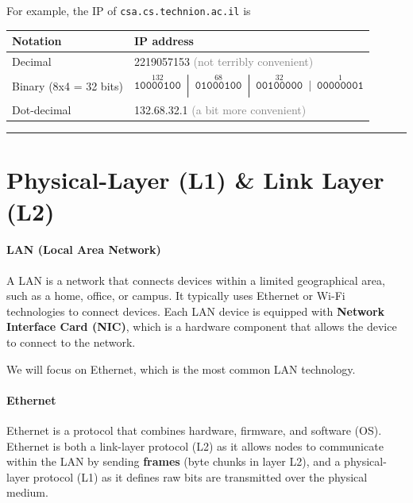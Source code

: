 \documentclass[openany,12pt]{book}
\begin{document}
\vspace{0.5em} %
\begin{center}
  For example, the IP of \texttt{csa.cs.technion.ac.il} is
  \begin{tabular}{ll}
    \toprule
    \textbf{Notation}      & \textbf{IP address}                                                              \\
    \midrule
    Decimal                & 2219057153 \textcolor{gray}{(not terribly convenient)}                           \\[1.5ex]
    Binary (8x4 = 32 bits) &
    $\overset{132}{\texttt{10000100}} \enspace | \enspace
      \overset{68}{\texttt{01000100}} \enspace | \enspace
      \overset{32}{\texttt{00100000}} \enspace | \enspace
    \overset{1}{\texttt{00000001}}$                                                                           \\[1.5ex]
    Dot-decimal            & \textcolor{blue!80!black}{132.68.32.1} \textcolor{gray}{(a bit more convenient)} \\
    \bottomrule
  \end{tabular}
\end{center}



\noindent\rule{\linewidth}{0.5pt}


\section*{Physical-Layer (L1) \& Link Layer (L2)}

\paragraph{LAN (Local Area Network)} A LAN is a network that connects devices within a limited geographical area, such as a home, office, or campus. It typically uses Ethernet or Wi-Fi technologies to connect devices. Each LAN device is equipped with \textbf{Network Interface Card (NIC)}, which is a hardware component that allows the device to connect to the network. 

We will focus on Ethernet, which is the most common LAN technology. 

\paragraph{Ethernet} Ethernet is a protocol that combines hardware, firmware, and software (OS). Ethernet is both a link-layer protocol (L2) as it allows nodes to communicate within the LAN by sending \textbf{frames} (byte chunks in layer L2), and a physical-layer protocol (L1) as it defines raw bits are transmitted over the physical medium.
\end{document}
